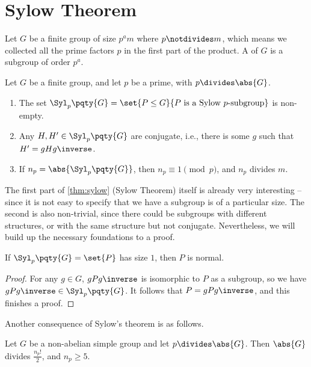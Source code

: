 \section{Sylow Theorem}

Let \(G\) be a finite group of size \(p^{a} m\) where \(p \notdivides m\), which means we collected all the prime factors \(p\) in the first part of the product. A  of \(G\) is a subgroup of order \(p^a\).

\begin{theorem}
    \label{thm:sylow}%
    Let \(G\) be a finite group, and let \(p\) be a prime, with \(p \divides \abs{G}\).

    \begin{enumerate}
        \item The set \(\Syl_p\pqty{G} = \set{P \leq G}{P \text{ is a Sylow } p\text{-subgroup}}\) is non-empty.
        \item Any \(H, H' \in \Syl_p \pqty{G}\) are conjugate, i.e., there is some \(g\) such that \(H' = g H g\inverse\).
        \item If \(n_p = \abs{\Syl_p \pqty{G}}\), then \(n_p \equiv 1 \pmod{p}\), and \(n_p\) divides \(m\).
    \end{enumerate}
\end{theorem}

The first part of \autoref{thm:sylow} (Sylow Theorem) itself is already very interesting -- since it is not easy to specify that we have a subgroup is of a particular size. The second is also non-trivial, since there could be subgroups with different structures, or with the same structure but not conjugate. Nevertheless, we will build up the necessary foundations to a proof.

\begin{lemma}
    If \(\Syl_p\pqty{G} = \set{P}\) has size \(1\), then \(P\) is normal.
\end{lemma}

\begin{proof}
    For any \(g \in G\), \(g P g\inverse\) is isomorphic to \(P\) as a subgroup, so we have \(g P g\inverse \in \Syl_p\pqty{G}\). It follows that \(P = g P g\inverse\), and this finishes a proof.
\end{proof}

Another consequence of Sylow's theorem is as follows.

\begin{corollary}
    \label{cor:np-and-g}%
    Let \(G\) be a non-abelian simple group and let \(p \divides \abs{G}\). Then \(\abs{G}\) divides \(\frac{n_p!}{2}\), and \(n_p \geq 5\).
\end{corollary}


